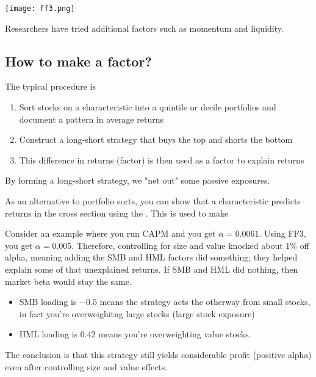 \documentclass[12pt]{scrartcl}
\begin{document}
\texttt{[image: ff3.png]}

\begin{note}
  Researchers have tried additional factors such as momentum and liquidity.
\end{note}

\subsection{How to make a factor?}

\begin{note}
  The typical procedure is 
  \begin{enumerate}
    \item Sort stocks on a characteristic into a quintile or decile portfolios and document a pattern in average returns
    \item Construct a long-short strategy that buys the top and shorts the bottom
    \item This difference in returns (factor) is then used as a factor to explain returns
  \end{enumerate}

  By forming a long-short strategy, we "net out" some passive exposures.
\end{note}

\begin{note}
  As an alternative to portfolio sorts, you can show that a characteristic predicts returns 
  in the cross section using the . This is used to make 
\end{note}

\begin{example}
  Consider an example where you run CAPM and you get $\alpha = 0.0061$. Using 
  FF3, you get $\alpha=0.005$. Therefore, controlling for size and value knocked about
  $1\%$ off alpha, meaning adding the SMB and HML factors did something; they helped explain some of that 
  unexplained returns. If SMB and HML did nothing, then market beta would stay the same. 

  \begin{itemize}
    \item SMB loading is $-0.5$ means the strategy acts the otherway from small stocks, in fact you're overweighitng large stocks (large stock exposure)
    \item HML loading is $0.42$ means you're overweighting value stocks.
  \end{itemize}

  The conclusion is that this strategy still yields considerable profit (positive alpha) even 
  after controlling size and value effects. 
\end{example}
\end{document}
